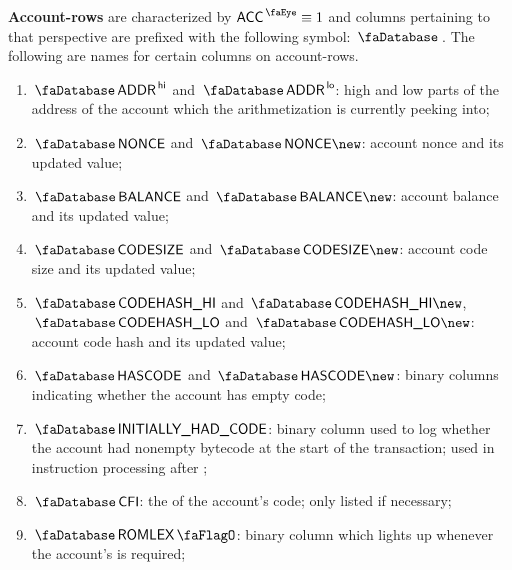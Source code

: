 \textbf{Account-rows} are characterized by $\peekAccount \equiv 1$ and columns pertaining to that perspective are prefixed with the following symbol: $\accountSignifier$. The following are names for certain columns on account-rows.
\begin{enumerate}
	\item $\accAddress\high$ and $\accAddress\low$:
		high and low parts of the address of the account which the arithmetization is currently peeking into;
	\item $\accNonce$ and $\accNonce\new$:
		account nonce and its updated value;
	\item $\accBalance$ and $\accBalance\new$:
		account balance and its updated value;
	\item $\accCodesize$ and $\accCodesize\new$:
		account code size and its updated value;
	\item $\accCodehashHi$ and $\accCodehashHi\new$, $\accCodehashLo$ and $\accCodehashLo\new$:
		account code hash and its updated value;
	\item $\accHasCode$ and $\accHasCode\new$:
		binary columns indicating whether the account has empty code;
	\item $\accInitiallyHadCode$:
		binary column used to log whether the account had nonempty bytecode at the start of the transaction;
		used in  instruction processing after \cite{EIP-6780};
	\item $\accCfi$:
		the \CFI{} of the account's code; only listed if necessary;
	\item $\accRomLexFlag$:
		binary column which lights up whenever the account's \CFI{} is required;
\end{enumerate}

